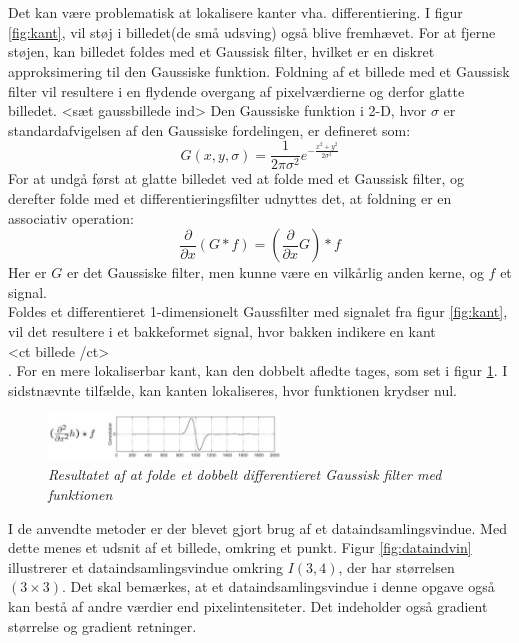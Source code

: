 \\
\\
Det kan være problematisk at lokalisere kanter vha. differentiering. I figur \ref{fig:kant}, vil støj i billedet(de små udsving) også blive fremhævet. For at fjerne støjen, kan billedet foldes med et Gaussisk filter, hvilket er en diskret approksimering til den Gaussiske funktion. Foldning af et billede med et Gaussisk filter vil resultere i en flydende overgang af pixelværdierne og derfor glatte billedet. <sæt gaussbillede ind> Den Gaussiske funktion i 2-D, hvor $ \sigma $ er standardafvigelsen af den Gaussiske fordelingen, er defineret som:
\begin{equation}
G(x,y,\sigma) = \frac{1}{2 \pi \sigma ^{2}} e^{- \frac{x^{2} + y^{2}}{2 \sigma ^{2}}}
\label{2dgaussian}
\end{equation} 
For at undgå først at glatte billedet ved at folde med et Gaussisk filter, og derefter folde med et differentieringsfilter udnyttes det, at foldning er en associativ operation:
\begin{equation}
\dfrac{\partial}{\partial x}(G \ast f) = (\dfrac{\partial}{\partial x}G) \ast f
\end{equation}
Her er $G$ er det Gaussiske filter, men kunne være en vilkårlig anden kerne, og $f$ et signal. 
\\
Foldes et differentieret 1-dimensionelt Gaussfilter med signalet fra figur \ref{fig:kant}, vil det resultere i et bakkeformet signal, hvor bakken indikere en kant \\ <ct billede /ct> \\ . For en mere lokaliserbar kant, kan den dobbelt afledte tages, som set i figur \ref{fig:deriv}. I sidstnævnte tilfælde, kan kanten lokaliseres, hvor funktionen krydser nul.
\begin{figure}[H]
    \centering
    \includegraphics[width=0.55\textwidth]{fig/8.png}
    \vspace{-1em}   
    \begin{center}
    \caption{{\footnotesize \textit{
     Resultatet af at folde et dobbelt differentieret Gaussisk filter med funktionen}}}
    \label{fig:deriv}
     \end{center}
    \vspace{-2.5em}  
  \end{figure}
\noindent
I de anvendte metoder er der blevet gjort brug af et dataindsamlingsvindue. Med dette menes et udsnit af et billede, omkring et punkt. Figur \ref{fig:dataindvin} illustrerer et dataindsamlingsvindue omkring $I(3,4)$, der har størrelsen $(3 \times 3)$. Det skal bemærkes, at et dataindsamlingsvindue i denne opgave også kan bestå af andre værdier end pixelintensiteter. Det indeholder også gradient størrelse og gradient retninger.
